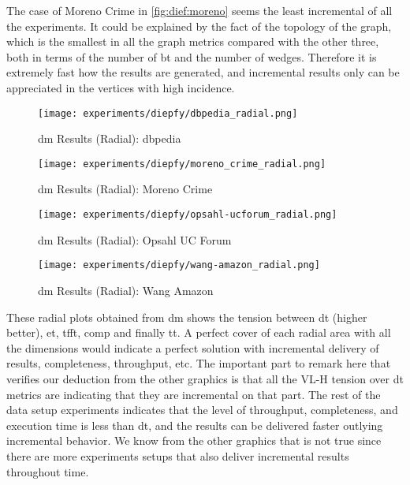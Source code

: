 The case of Moreno Crime in \autoref{fig:dief:moreno} seems the least incremental of all the experiments. It could be explained by the fact of the topology of the graph, which is the smallest in all the graph metrics compared with the other three, both in terms of the number of \acrshort{bt} and the number of wedges.
Therefore it is extremely fast how the results are generated, and incremental results only can be appreciated in the vertices with high incidence.

\begin{figure}[!htb]
  \centering
  \begin{minipage}{0.5\textwidth}
   \texttt{[image: experiments/diepfy/dbpedia\_radial.png]}
    \caption{\acrshort{dm} Results (Radial): \acrshort{dbpedia}}
    \label{fig:dief:dbpedia-radial}
  \end{minipage}%
  \begin{minipage}{0.5\textwidth}
   \texttt{[image: experiments/diepfy/moreno\_crime\_radial.png]}
    \caption{\acrshort{dm} Results (Radial): Moreno Crime}
    \label{fig:dief:moreno-radial}
  \end{minipage}
\end{figure}
%
\begin{figure}[!htb]
  \centering
  \begin{minipage}{0.5\textwidth}
   \texttt{[image: experiments/diepfy/opsahl-ucforum\_radial.png]}
    \caption{\acrshort{dm} Results (Radial): Opsahl UC Forum}
    \label{fig:dief:opsahl-radial}
  \end{minipage}%
  \begin{minipage}{0.5\textwidth}
    \texttt{[image: experiments/diepfy/wang-amazon\_radial.png]}
     \caption{\acrshort{dm} Results (Radial): Wang Amazon}
     \label{fig:dief:wang-radial}
   \end{minipage}
 \end{figure}

These radial plots obtained from \acrshort{dm} shows the tension between \acrfull{dt} (higher better),
\acrfull{et}, \acrfull{tfft}, \acrfull{comp} and finally \acrfull{tt}. A perfect cover of each radial area with all the dimensions would
indicate a perfect solution with incremental delivery of results, completeness, throughput, etc. The important part to remark here that verifies
our deduction from the other graphics is that all the VL-H tension over \acrshort{dt} metrics are indicating that they are incremental on that part. 
The rest of the data setup experiments indicates that the level of throughput, completeness, and execution time is less than \acrfull{dt}, and the results can be delivered faster outlying incremental behavior. 
We know from the other graphics that is not true since there are more experiments setups that also deliver incremental results throughout time.

